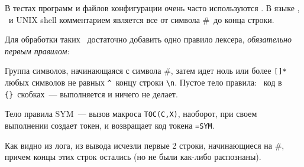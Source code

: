 \label{minicomment}

В тестах программ и файлов конфигурации очень часто используются
. В языке \py, \bi\ и UNIX shell комментарием является все
от символа \#\ до конца строки.

Для обработки таких \
достаточно добавить одно правило лексера, \emph{обязательно первым правилом}:


Группа символов, начинающаяся с символа \#, затем идет ноль или более \verb|[]*|
любых символов не равных \verb|^|\ концу строки \verb|\n|.
Пустое тело правила: \cpp\ код в \verb|{}|\ скобках\ --- выполняется и ничего не
делает.

Тело правила SYM\ --- вызов макроса \verb|TOC(C,X)|, наоборот, при своем
выполнении создает токен, и возвращает код токена \verb|=SYM|.


Как видно из лога, из вывода исчезли первые 2 строки, начинающиеся на \#, причем
концы этих строк остались (но не были как-либо распознаны).